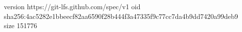 version https://git-lfs.github.com/spec/v1
oid sha256:4ac5282e1bbeecf82aa6590f28b444f3a47335f9c77cc7da4b9dd7420a99deb9
size 151776
